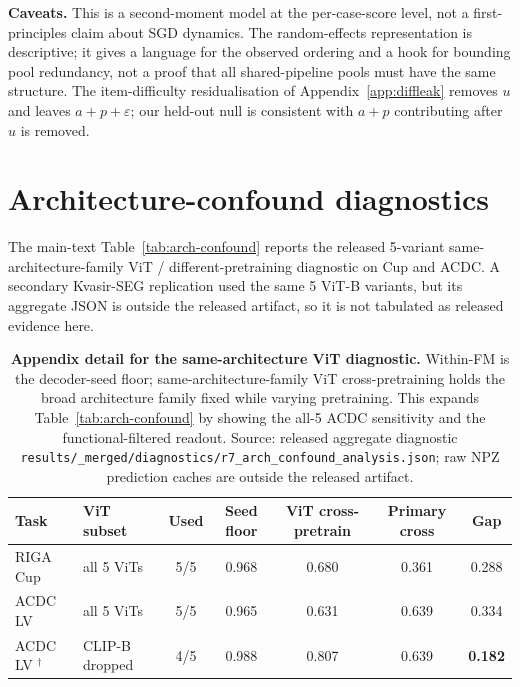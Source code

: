 \textbf{Caveats.} This is a second-moment model at the per-case-score level, not
a first-principles claim about SGD dynamics. The random-effects representation
is descriptive; it gives a language for the observed ordering and a hook for
bounding pool redundancy, not a proof that all shared-pipeline pools must have
the same structure. The item-difficulty residualisation of Appendix~\ref{app:diffleak}
removes $u$ and leaves $a + p + \varepsilon$; our held-out null is consistent with
$a + p$ contributing after $u$ is removed.


\section{Architecture-confound diagnostics}
\label{app:arch-3task}

The main-text Table~\ref{tab:arch-confound} reports the released 5-variant
same-architecture-family ViT / different-pretraining diagnostic on Cup and ACDC. A secondary
Kvasir-SEG replication used the same 5 ViT-B variants, but its aggregate JSON is
outside the released artifact, so it is not tabulated as released
evidence here.

\begin{table}[!htbp]
  \caption{\textbf{Appendix detail for the same-architecture ViT diagnostic.}
  Within-FM is the decoder-seed floor; same-architecture-family ViT cross-pretraining holds the
  broad architecture family fixed while varying pretraining. This expands
  Table~\ref{tab:arch-confound} by showing the all-5 ACDC sensitivity and the
  functional-filtered readout. Source:
  released aggregate diagnostic \texttt{results/\_merged/diagnostics/r7\_arch\_confound\_analysis.json};
  raw NPZ prediction caches are outside the released artifact.}
  \label{tab:arch-confound-3task}
  \centering\scriptsize
  \setlength{\tabcolsep}{3pt}
  \begin{tabular*}{\linewidth}{@{\extracolsep{\fill}}llccccc}
    \toprule
    Task & ViT subset & Used & Seed floor & ViT cross-pretrain & Primary cross & Gap \\
    \midrule
    RIGA Cup & all 5 ViTs & 5/5 & 0.968 & 0.680 & 0.361 & 0.288 \\
    ACDC LV & all 5 ViTs & 5/5 & 0.965 & 0.631 & 0.639 & 0.334 \\
    ACDC LV $^{\dag}$ & CLIP-B dropped & 4/5 & 0.988 & 0.807 & 0.639 & \textbf{0.182} \\
    \bottomrule
  \end{tabular*}
\end{table}

